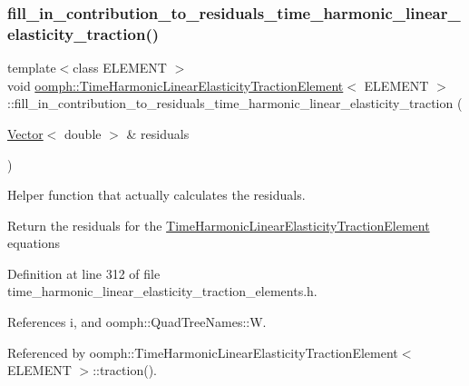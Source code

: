 \subsubsection{\texorpdfstring{fill\+\_\+in\+\_\+contribution\+\_\+to\+\_\+residuals\+\_\+time\+\_\+harmonic\+\_\+linear\+\_\+elasticity\+\_\+traction()}{fill\_in\_contribution\_to\_residuals\_time\_harmonic\_linear\_elasticity\_traction()}}
{\footnotesize\ttfamily template$<$class E\+L\+E\+M\+E\+NT $>$ \\
void \hyperlink{classoomph_1_1TimeHarmonicLinearElasticityTractionElement}{oomph\+::\+Time\+Harmonic\+Linear\+Elasticity\+Traction\+Element}$<$ E\+L\+E\+M\+E\+NT $>$\+::fill\+\_\+in\+\_\+contribution\+\_\+to\+\_\+residuals\+\_\+time\+\_\+harmonic\+\_\+linear\+\_\+elasticity\+\_\+traction (\begin{DoxyParamCaption}\item[{\hyperlink{classoomph_1_1Vector}{Vector}$<$ double $>$ \&}]{residuals }\end{DoxyParamCaption})\hspace{0.3cm}{\ttfamily [protected]}}



Helper function that actually calculates the residuals. 

Return the residuals for the \hyperlink{classoomph_1_1TimeHarmonicLinearElasticityTractionElement}{Time\+Harmonic\+Linear\+Elasticity\+Traction\+Element} equations 

Definition at line 312 of file time\+\_\+harmonic\+\_\+linear\+\_\+elasticity\+\_\+traction\+\_\+elements.\+h.



References i, and oomph\+::\+Quad\+Tree\+Names\+::W.



Referenced by oomph\+::\+Time\+Harmonic\+Linear\+Elasticity\+Traction\+Element$<$ E\+L\+E\+M\+E\+N\+T $>$\+::traction().

\mbox{\label{classoomph_1_1TimeHarmonicLinearElasticityTractionElement_a7f6a07e3388fa87693fc890c790d7fcc}} 
